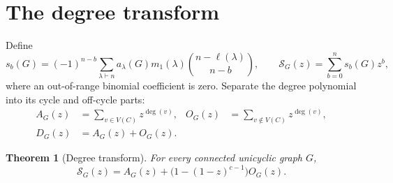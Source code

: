 \documentclass[11pt]{amsart}
\newtheorem{theorem}{Theorem}[section]
\theoremstyle{definition}
\newcommand{\cycle}{C}
\begin{document}
\section{The degree transform}

Define
\[
s_b(G)=(-1)^{n-b}\sum_{\lambda\vdash n}a_\lambda(G)
m_1(\lambda)\binom{n-\ell(\lambda)}{n-b},
\qquad
\mathcal S_G(z)=\sum_{b=0}^{n}s_b(G)z^b,
\]
where an out-of-range binomial coefficient is zero.  Separate the degree
polynomial into its cycle and off-cycle parts:
\begin{align*}
A_G(z)&=\sum_{v\in V(\cycle)}z^{\deg(v)},&
O_G(z)&=\sum_{v\notin V(\cycle)}z^{\deg(v)},\\
D_G(z)&=A_G(z)+O_G(z).&&
\end{align*}

\begin{theorem}[Degree transform]\label{thm:degree-transform}
For every connected unicyclic graph \(G\),
\begin{equation}\label{eq:degree-transform}
\mathcal S_G(z)=A_G(z)+\bigl(1-(1-z)^{c-1}\bigr)O_G(z).
\end{equation}
\end{theorem}
\end{document}
